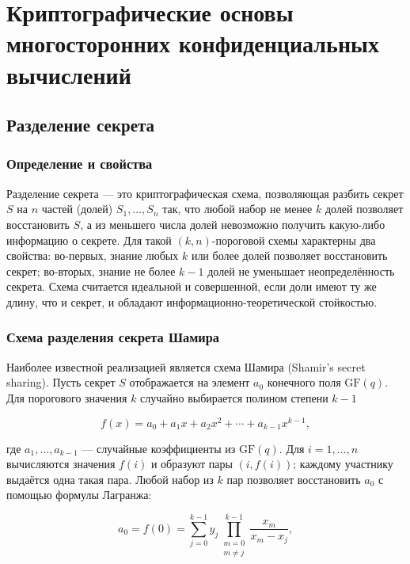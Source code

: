 \section{Криптографические основы многосторонних конфиденциальных вычислений}
\label{sec:cryptographic-foundations}

\subsection{Разделение секрета}

\subsubsection{Определение и свойства}

Разделение секрета --- это криптографическая схема, позволяющая разбить секрет \(S\) на \(n\) частей (долей) \(S_1,\ldots,S_n\) так, что любой набор не менее \(k\) долей позволяет восстановить \(S\), а из меньшего числа долей невозможно получить какую-либо информацию о секрете. Для такой \((k,n)\)-пороговой схемы характерны два свойства: во-первых, знание любых \(k\) или более долей позволяет восстановить секрет; во-вторых, знание не более \(k-1\) долей не уменьшает неопределённость секрета. Схема считается идеальной и совершенной, если доли имеют ту же длину, что и секрет, и обладают информационно-теоретической стойкостью.

\subsubsection{Схема разделения секрета Шамира}

Наиболее известной реализацией является схема Шамира (Shamir’s secret sharing).  Пусть секрет \(S\) отображается на элемент \(a_0\) конечного поля \(\mathrm{GF}(q)\).  Для порогового значения \(k\) случайно выбирается полином степени \(k-1\)

\begin{equation}
f(x) = a_0 + a_1x + a_2x^2 + \cdots + a_{k-1}x^{k-1},
\end{equation}

где \(a_1,\ldots,a_{k-1}\) --- случайные коэффициенты из \(\mathrm{GF}(q)\).  Для \(i=1,\ldots,n\) вычисляются значения \(f(i)\) и образуют пары \((i, f(i))\); каждому участнику выдаётся одна такая пара.  Любой набор из \(k\) пар позволяет восстановить \(a_0\) с помощью формулы Лагранжа:

\begin{equation}
a_0 = f(0) = \sum_{j=0}^{k-1} y_j \prod_{\substack{m=0\\m \neq j}}^{k-1} \frac{x_m}{x_m - x_j},
\end{equation}

